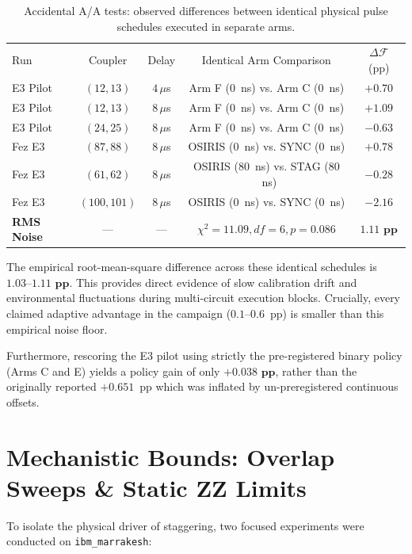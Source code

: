 \documentclass[aps,prl,twocolumn,amsmath,amssymb,superscriptaddress,floatfix]{revtex4-2}
\begin{document}
\begin{table}[h]
\caption{Accidental A/A tests: observed differences between identical physical pulse schedules executed in separate arms.}
\label{tab:aa}
\begin{ruledtabular}
\begin{tabular}{lcccc}
Run & Coupler & Delay & Identical Arm Comparison & $\Delta \mathcal{F}$ (pp) \\
\colrule
E3 Pilot & $(12, 13)$ & $4\,\mu$s & Arm F ($0$~ns) vs. Arm C ($0$~ns) & $+0.70$ \\
E3 Pilot & $(12, 13)$ & $8\,\mu$s & Arm F ($0$~ns) vs. Arm C ($0$~ns) & $+1.09$ \\
E3 Pilot & $(24, 25)$ & $8\,\mu$s & Arm F ($0$~ns) vs. Arm C ($0$~ns) & $-0.63$ \\
Fez E3 & $(87, 88)$ & $8\,\mu$s & OSIRIS ($0$~ns) vs. SYNC ($0$~ns) & $+0.78$ \\
Fez E3 & $(61, 62)$ & $8\,\mu$s & OSIRIS ($80$~ns) vs. STAG ($80$~ns) & $-0.28$ \\
Fez E3 & $(100, 101)$ & $8\,\mu$s & OSIRIS ($0$~ns) vs. SYNC ($0$~ns) & $-2.16$ \\
\colrule
\textbf{RMS Noise} & --- & --- & $\chi^2 = 11.09, df = 6, p = 0.086$ & $\mathbf{1.11\text{ pp}}$ \\
\end{tabular}
\end{ruledtabular}
\end{table}

The empirical root-mean-square difference across these identical schedules is $\mathbf{1.03\text{--}1.11\text{ pp}}$. This provides direct evidence of slow calibration drift and environmental fluctuations during multi-circuit execution blocks. Crucially, every claimed adaptive advantage in the campaign ($0.1\text{--}0.6$~pp) is smaller than this empirical noise floor.

Furthermore, rescoring the E3 pilot using strictly the pre-registered binary policy (Arms C and E) yields a policy gain of only $\mathbf{+0.038\text{ pp}}$, rather than the originally reported $+0.651$~pp which was inflated by un-preregistered continuous offsets.

\section{Mechanistic Bounds: Overlap Sweeps \& Static ZZ Limits}
To isolate the physical driver of staggering, two focused experiments were conducted on \texttt{ibm\_marrakesh}:
\end{document}
